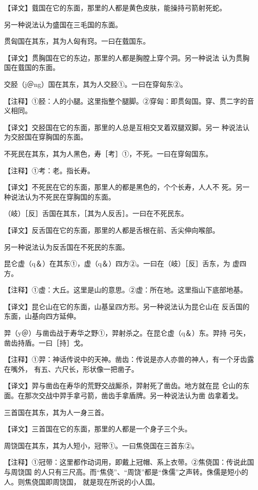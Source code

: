 \documentclass[a4paper,12pt,UTF8,twoside]{ctexbook}
\begin{document}
【译文】臷国在它的东面，那里的人都是黄色皮肤，能操持弓箭射死蛇。

另一种说法认为盛国在三毛国的东面。

贯匈国在其东，其为人匈有窍。一曰在臷国东。

【译文】贯胸国在它的东边，那里的人都是胸膛上穿个洞。另一种说法 认为贯胸国在臷国的东面。

交胫（j＠ng）国在其东，其为人交胫①。一曰在穿匈东②。

【注释】①胫：人的小腿。这里指整个腿脚。②穿匈：即贯匈国。穿、贯二字的音义相同。

【译文】交胫国在它的东面，那里的人总是互相交叉着双腿双脚。另一 种说法认为交胫国在穿胸国的东面。

不死民在其东，其为人黑色，寿［考］①，不死。一曰在穿匈国东。

【注释】①考：老。指长寿。

【译文】不死民在它的东面，那里人的都是黑色的，个个长寿，人人不 死。另一种说法认为不死民在穿胸国的东面。

（岐）［反］舌国在其东，［其为人反舌］。一曰在不死民东。

【译文】反舌国在它的东面，那里的人都是舌根在前、舌尖伸向喉部。

另一种说法认为反舌国在不死民的东面。

昆仑虚（q＆）在其东①，虚（q＆）四方②。一曰在（岐）［反］舌东，为 虚四方。

【注释】①虚：大丘。这里是山的意思。②虚：所在地。这里指山下底部地基。

【译文】昆仑山在它的东面，山基呈四方形。另一种说法认为昆仑山在 反舌国的东面，山基向四方延伸。

羿（y＠）与凿齿战于寿华之野①，羿射杀之。在昆仑虚（q＆）东。羿持 弓矢，凿齿持盾。一曰［持］戈。

【注释】①羿：神话传说中的天神。凿齿：传说是亦人亦兽的神人，有一个牙齿露在嘴外， 有五、六尺长，形状像一把凿子。

【译文】羿与凿齿在寿华的荒野交战厮杀，羿射死了凿齿。地方就在昆 仑山的东面。在那次交战中羿手拿弓箭，凿齿手拿盾牌。另一种说法认为凿 齿拿着戈。

三首国在其东，其为人一身三首。

【译文】三首国在它的东面，那里的人都是一个身子三个头。

周饶国在其东，其为人短小，冠带①。一曰焦侥国在三首东②。

【注释】①冠带：这里都作动词用，即戴上冠帽、系上衣带。②焦侥国：传说此国与周饶国 的人只有三尺高。而“焦侥”、“周饶”都是“侏儒”之声转。侏儒是短小的人。则焦侥国即周饶国， 就是现在所说的小人国。
\end{document}
